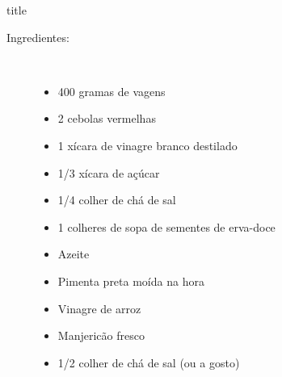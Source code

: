 \documentclass [11pt, letterpaper] {article}
\begin{document}
 {title}

\begin {description}

\item [Ingredientes:] \ \\
\begin {itemize}
\item 400  gramas de vagens
\item 2 cebolas vermelhas
\item 1 xícara de vinagre branco destilado
\item 1/3 xícara de açúcar
\item 1/4 colher de chá de sal
\item 1 colheres de sopa de sementes de erva-doce
\item Azeite
\item Pimenta preta mo\'ida na hora
\item Vinagre de arroz
\item Manjericão fresco
\item 1/2 colher de chá de sal (ou a gosto)
\end {itemize}


\end{description}
\end{document}
